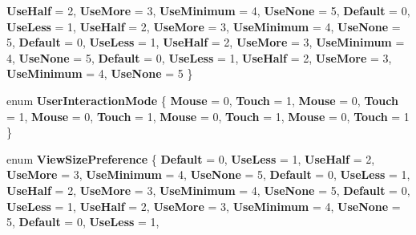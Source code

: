 \begin{DoxyCompactItemize}
{\bfseries Use\+Half} = 2, 
{\bfseries Use\+More} = 3, 
{\bfseries Use\+Minimum} = 4, 
{\bfseries Use\+None} = 5, 
\newline
{\bfseries Default} = 0, 
{\bfseries Use\+Less} = 1, 
{\bfseries Use\+Half} = 2, 
{\bfseries Use\+More} = 3, 
\newline
{\bfseries Use\+Minimum} = 4, 
{\bfseries Use\+None} = 5, 
{\bfseries Default} = 0, 
{\bfseries Use\+Less} = 1, 
\newline
{\bfseries Use\+Half} = 2, 
{\bfseries Use\+More} = 3, 
{\bfseries Use\+Minimum} = 4, 
{\bfseries Use\+None} = 5, 
\newline
{\bfseries Default} = 0, 
{\bfseries Use\+Less} = 1, 
{\bfseries Use\+Half} = 2, 
{\bfseries Use\+More} = 3, 
\newline
{\bfseries Use\+Minimum} = 4, 
{\bfseries Use\+None} = 5
 \}
\item 
\mbox{\label{namespace_windows_1_1_u_i_1_1_view_management_a164710c9a26d432f77ce83ece619738d}} 
enum {\bfseries User\+Interaction\+Mode} \{ \newline
{\bfseries Mouse} = 0, 
{\bfseries Touch} = 1, 
{\bfseries Mouse} = 0, 
{\bfseries Touch} = 1, 
\newline
{\bfseries Mouse} = 0, 
{\bfseries Touch} = 1, 
{\bfseries Mouse} = 0, 
{\bfseries Touch} = 1, 
\newline
{\bfseries Mouse} = 0, 
{\bfseries Touch} = 1
 \}
\item 
\mbox{\label{namespace_windows_1_1_u_i_1_1_view_management_aa4519c5469b746d5898bd904a05a819a}} 
enum {\bfseries View\+Size\+Preference} \{ \newline
{\bfseries Default} = 0, 
{\bfseries Use\+Less} = 1, 
{\bfseries Use\+Half} = 2, 
{\bfseries Use\+More} = 3, 
\newline
{\bfseries Use\+Minimum} = 4, 
{\bfseries Use\+None} = 5, 
{\bfseries Default} = 0, 
{\bfseries Use\+Less} = 1, 
\newline
{\bfseries Use\+Half} = 2, 
{\bfseries Use\+More} = 3, 
{\bfseries Use\+Minimum} = 4, 
{\bfseries Use\+None} = 5, 
\newline
{\bfseries Default} = 0, 
{\bfseries Use\+Less} = 1, 
{\bfseries Use\+Half} = 2, 
{\bfseries Use\+More} = 3, 
\newline
{\bfseries Use\+Minimum} = 4, 
{\bfseries Use\+None} = 5, 
{\bfseries Default} = 0, 
{\bfseries Use\+Less} = 1, 

\end{DoxyCompactItemize}
